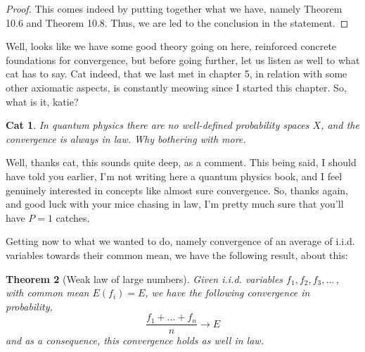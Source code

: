\documentclass[12pt]{amsbook}
\newtheorem{theorem}{Theorem}[chapter]
\newtheorem{cat}[theorem]{Cat}
\begin{document}
\begin{proof}
This comes indeed by putting together what we have, namely Theorem 10.6 and Theorem 10.8. Thus, we are led to the conclusion in the statement.
\end{proof}

Well, looks like we have some good theory going on here, reinforced concrete foundations for convergence, but before going further, let us listen as well to what cat has to say. Cat indeed, that we last met in chapter 5, in relation with some other axiomatic aspects, is constantly meowing since I started this chapter. So, what is it, katie?

\begin{cat}
In quantum physics there are no well-defined probability spaces $X$, and the convergence is always in law. Why bothering with more.
\end{cat}

Well, thanks cat, this sounds quite deep, as a comment. This being said, I should have told you earlier, I'm not writing here a quantum physics book, and I feel genuinely interested in concepts like almost sure convergence. So, thanks again, and good luck with your mice chasing in law, I'm pretty much sure that you'll have $P=1$ catches.

\bigskip

Getting now to what we wanted to do, namely convergence of an average of i.i.d. variables towards their common mean, we have the following result, about this:


\begin{theorem}[Weak law of large numbers]
Given i.i.d. variables $f_1,f_2,f_3,\ldots\,$, with common mean $E(f_i)=E$, we have the following convergence in probability,
$$\frac{f_1+\ldots+f_n}{n}\to E$$
and as a consequence, this convergence holds as well in law.
\end{theorem}
\end{document}
